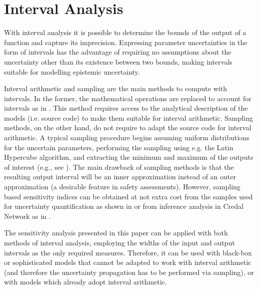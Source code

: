 \documentclass[twocolumn]{rps-esrel2022}
\begin{document}
\section{Interval Analysis}

With interval analysis it is possible to determine the bounds of the output of a function and capture its imprecision. Expressing parameter uncertainties in the form of intervals has the advantage of requiring no assumptions about the uncertainty other than its existence between two bounds, making intervals suitable for modelling epistemic uncertainty.

Interval arithmetic and sampling are the main methods to compute with intervals.
In the former, the mathematical operations are replaced to account for intervals as in \cite{moore2009introduction}.
This method requires access to the analytical description of the models (i.e. source code) to make them suitable for
interval arithmetic.
Sampling methods, on the other hand, do not require to adapt the source code for interval arithmetic.
A typical sampling procedure begins assuming uniform distributions for the uncertain parameters, performing
the sampling using e.g. the Latin Hypercube algorithm, and extracting the minimum and maximum of the outputs of interest 
(e.g., see \cite{helton2010representation}).
The main drawback of sampling methods is that the resulting output interval will be an inner approximation instead of an outer approximation (a desirable feature in safety assessments). However, sampling based sensitivity indices can be obtained at not extra cost from the samples used for uncertainty quantification as shown in \cite{PLISCHKE2013536} or from inference analysis in Credal Network as in \cite{Tolo2018126} .

The sensitivity analysis presented in this paper can be applied with both methods of interval analysis, employing the widths of the input and output intervals as
the only required measures.
Therefore, it can be used with black-box or sophisticated models that cannot be adapted to work with interval arithmetic (and therefore the uncertainty propagation
has to be performed via sampling), or with models which already adopt interval arithmetic.

\end{document}
